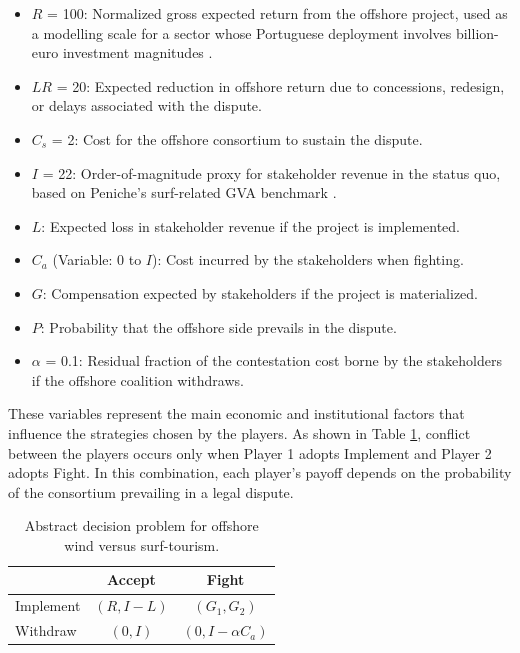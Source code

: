 \documentclass[final,times,authoryear]{elsarticle}
\newcommand{\verify}[1]{{\color{blue} {#1}}}
\begin{document}
    \begin{itemize}
    \item $R$ = 100: Normalized gross expected return from the offshore project, used as a modelling scale for a sector whose Portuguese deployment involves billion-euro investment magnitudes \citep{iberblue_isq_2023,macedo_vitorino_paer_2025}.
    \item \verify{$LR$ = 20: Expected reduction in offshore return due to concessions, redesign, or delays associated with the dispute.}
    \item \verify{$C_s$ = 2: Cost for the offshore consortium to sustain the dispute.}
    \item $I$ = 22: Order-of-magnitude proxy for stakeholder revenue in the status quo, based on Peniche's surf-related GVA benchmark \citep{melo_wsl_economy_impact2025,iseg_melo_wsl_page}.
    \item $L$: Expected loss in stakeholder revenue if the project is implemented.
    \item $C_a$ (Variable: 0 to $I$): Cost incurred by the stakeholders when fighting.
    \item $G$: Compensation expected by stakeholders if the project is materialized.
    \item \verify{$P$: Probability that the offshore side prevails in the dispute.}
    \item \verify{$\alpha$ = 0.1: Residual fraction of the contestation cost borne by the stakeholders if the offshore coalition withdraws.}
    \end{itemize}

These variables represent the main economic and institutional factors that influence the strategies chosen by the players. As shown in Table \ref{tab:abstract_game}, conflict between the players occurs only when Player 1 adopts Implement and Player 2 adopts Fight. In this combination, each player's payoff depends on the probability of the consortium prevailing in a legal dispute.

    \begin{table}[H]
    \centering
    \caption{Abstract decision problem for offshore wind versus surf-tourism.}
    \label{tab:abstract_game}
    \begin{tabular}{lcc}
    \toprule
     & Accept & Fight \\
    \midrule
    Implement & $(R, I-L)$ & $(G_1, G_2)$ \\
    Withdraw & $(0, I)$ & $(0, I-\alpha C_a)$ \\
    \bottomrule
    \end{tabular}
    \end{table}
\end{document}
